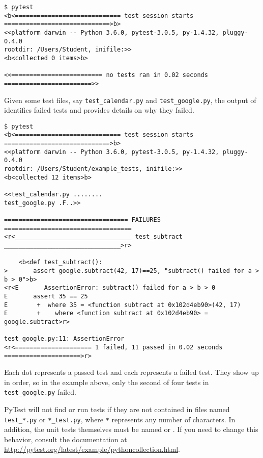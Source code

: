 \begin{lstlisting}
$ pytest
<b<============================= test session starts =============================>b>
<<platform darwin -- Python 3.6.0, pytest-3.0.5, py-1.4.32, pluggy-0.4.0
rootdir: /Users/Student, inifile:>>
<b<collected 0 items>b>

<<========================= no tests ran in 0.02 seconds ========================>>
\end{lstlisting}

Given some test files, say \texttt{test\_calendar.py} and \texttt{test\_google.py}, the output of  identifies failed tests and provides details on why they failed.

\begin{lstlisting}
$ pytest
<b<============================= test session starts =============================>b>
<<platform darwin -- Python 3.6.0, pytest-3.0.5, py-1.4.32, pluggy-0.4.0
rootdir: /Users/Student/example_tests, inifile:>>
<b<collected 12 items>b>

<<test_calendar.py ........
test_google.py .F..>>

================================== FAILURES ===================================
<r<________________________________ test_subtract ________________________________>r>

    <b<def test_subtract():
>       assert google.subtract(42, 17)==25, "subtract() failed for a > b > 0">b>
<r<E       AssertionError: subtract() failed for a > b > 0
E       assert 35 == 25
E        +  where 35 = <function subtract at 0x102d4eb90>(42, 17)
E        +    where <function subtract at 0x102d4eb90> = google.subtract>r>

test_google.py:11: AssertionError
<r<===================== 1 failed, 11 passed in 0.02 seconds =====================>r>
\end{lstlisting}

Each dot represents a passed test and each  represents a failed test. %
They show up in order, so in the example above, only the second of four tests in \texttt{test\_google.py} failed.

\begin{warn} %
PyTest will not find or run tests if they are not contained in files named \texttt{test\_*.py} or \texttt{*\_test.py}, where \texttt{*} represents any number of characters.
In addition, the unit tests themselves must be named  or .
If you need to change this behavior, consult the documentation at \url{http://pytest.org/latest/example/pythoncollection.html}.
\end{warn}


